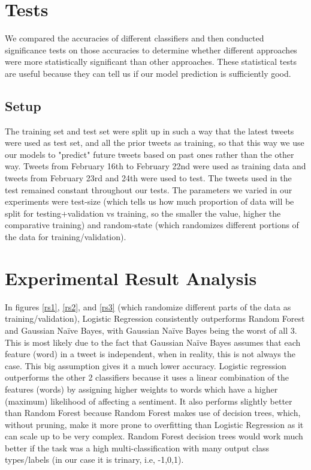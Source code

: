 \documentclass[]{IEEEtran}
\begin{document}
\section{Tests}
We compared the accuracies of different classifiers 
and then conducted significance tests on those accuracies to determine whether
different approaches were more statistically significant than other approaches. These
statistical tests are useful because they can tell us if our model prediction is sufficiently good.

\subsection{Setup}
The training set and test set were split up in such a way that the latest tweets were used as test set, and all the prior tweets as training, so that this way we use our models to "predict" future tweets based on past ones rather than the other way. Tweets from February 16th to February 22nd were used as training data and tweets from February 23rd and 24th were used to test. The tweets used in the test remained constant throughout our tests. The parameters we varied in our experiments were test-size (which tells us how much proportion of data will be split for testing+validation vs training, so the smaller the value, higher the comparative training) and random-state (which randomizes different portions of the data for training/validation).

\section{Experimental Result Analysis}
In figures \ref{rs1}, \ref{rs2}, and \ref{rs3} (which randomize different parts of the data as training/validation), Logistic Regression consistently outperforms Random Forest and Gaussian Na{\"i}ve Bayes, with Gaussian Na{\"i}ve Bayes being the worst of all 3. This is most likely due to the fact that Gaussian Na{\"i}ve Bayes assumes that each feature (word) in a tweet is independent, when in reality, this is not always the case. This big assumption gives it a much lower accuracy. Logistic regression outperforms the other 2 classifiers because it uses a linear combination of the features (words) by assigning higher weights to words which have a higher (maximum) likelihood of affecting a sentiment. It also performs slightly better than Random Forest because Random Forest makes use of decision trees, which, without pruning, make it more prone to overfitting than Logistic Regression as it can scale up to be very complex. Random Forest decision trees would work much better if the task was a high multi-classification with many output class types/labels (in our case it is trinary, i.e, -1,0,1).
\end{document}
